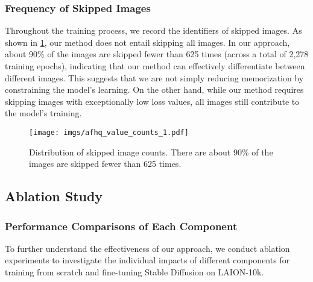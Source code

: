 \subsubsection{Frequency of Skipped Images}
Throughout the training process, we record the identifiers of skipped images. 
As shown in \cref{fig:value_counts}, our method does not entail skipping all images. 
In our approach, about 90\% of the images are skipped fewer than 625 times (across a total of 2,278 training epochs), indicating that our method can effectively differentiate between different images. 
This suggests that we are not simply reducing memorization by constraining the model's learning. 
On the other hand, while our method requires skipping images with exceptionally low loss values, all images still contribute to the model's training.
\begin{figure}[tb]
  \setlength{\abovecaptionskip}{-0pt} %
  \setlength{\belowcaptionskip}{-7pt} %
  \centering
  \texttt{[image: imgs/afhq\_value\_counts\_1.pdf]}
  \caption{
    Distribution of skipped image counts. There are about 90\% of the images are skipped fewer than 625 times. 
  }
  \label{fig:value_counts}
\end{figure}



\subsection{Ablation Study}
\label{sec:ablation}
\subsubsection{Performance Comparisons of Each Component}
To further understand the effectiveness of our approach, we conduct ablation experiments to investigate the individual impacts of different components for training from scratch and fine-tuning Stable Diffusion on LAION-10k. 


